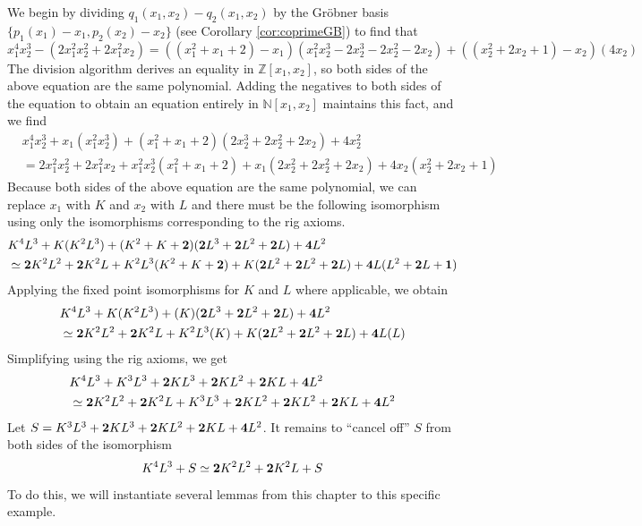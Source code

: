 \documentclass{msthesis}
\theoremstyle{definition}
\newcommand{\ints}{\mathbb{Z}}
\newcommand{\nat}{\mathbb{N}}
\begin{document}
We begin by dividing $q_1(x_1, x_2) - q_2(x_1,x_2)$ by the Gr\"obner basis $\{p_1(x_1) - x_1, p_2(x_2) - x_2\}$ (see Corollary \ref{cor:coprimeGB}) to find that
\[ x_1^4x_2^3 - (2x_1^2x_2^2 + 2x_1^2x_2) = ((x_1^2 + x_1 + 2) - x_1)(x_1^2x_2^3 - 2x_2^3 - 2x_2^2 - 2x_2) + ((x_2^2 + 2x_2 + 1) - x_2)(4x_2) \]
The division algorithm derives an equality in $\ints[x_1,x_2]$, so both sides of the above equation are the same polynomial.  Adding the negatives to both sides of the equation to obtain an equation entirely in $\nat[x_1,x_2]$ maintains this fact, and we find
\begin{align*}
    &x_1^4x_2^3 + x_1(x_1^2x_2^3) + (x_1^2 + x_1 + 2)(2x_2^3 + 2x_2^2 + 2x_2) + 4x_2^2 \\
    &= 2x_1^2x_2^2 + 2x_1^2x_2 + x_1^2x_2^3(x_1^2 + x_1 + 2) + x_1(2x_2^2 + 2x_2^2 + 2x_2) + 4x_2(x_2^2 + 2x_2 + 1)
\end{align*}
Because both sides of the above equation are the same polynomial, we can replace $x_1$ with $K$ and $x_2$ with $L$ and there must be the following isomorphism using only the isomorphisms corresponding to the rig axioms.
\begin{align*}
    &K^4L^3 + K(K^2L^3) + (K^2 + K + \mathbf{2})(\mathbf{2}L^3 + \mathbf{2}L^2 + \mathbf{2}L) + \mathbf{4}L^2 \\
    &\simeq \mathbf{2}K^2L^2 + \mathbf{2}K^2L + K^2L^3(K^2 + K + \mathbf{2}) + K(\mathbf{2}L^2 + \mathbf{2}L^2 + \mathbf{2}L) + \mathbf{4}L(L^2 + \mathbf{2}L + \mathbf{1})
\end{align*}
Applying the fixed point isomorphisms for $K$ and $L$ where applicable, we obtain
\begin{align*}
    &K^4L^3 + K(K^2L^3) + (K)(\mathbf{2}L^3 + \mathbf{2}L^2 + \mathbf{2}L) + \mathbf{4}L^2 \\
    &\simeq \mathbf{2}K^2L^2 + \mathbf{2}K^2L + K^2L^3(K) + K(\mathbf{2}L^2 + \mathbf{2}L^2 + \mathbf{2}L) + \mathbf{4}L(L)
\end{align*}
Simplifying using the rig axioms, we get
\begin{equation}\label{eq:mvexwiths}
\begin{aligned}
    &K^4L^3 + K^3L^3 + \mathbf{2}KL^3 + \mathbf{2}KL^2 + \mathbf{2}KL + \mathbf{4}L^2 \\
    &\simeq \mathbf{2}K^2L^2 + \mathbf{2}K^2L + K^3L^3 + \mathbf{2}KL^2 + \mathbf{2}KL^2 + \mathbf{2}KL + \mathbf{4}L^2
\end{aligned}
\end{equation}
Let $S = K^3L^3 + \mathbf{2}KL^3 + \mathbf{2}KL^2 + \mathbf{2}KL + \mathbf{4}L^2$.  It remains to ``cancel off'' $S$ from both sides of the isomorphism 
\[ K^4L^3 + S \simeq \mathbf{2}K^2L^2 + \mathbf{2}K^2L + S \]
To do this, we will instantiate several lemmas from this chapter to this specific example.
\end{document}
